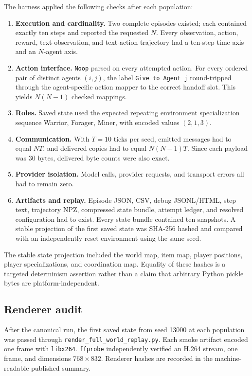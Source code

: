 \documentclass[11pt]{article}
\newcommand{\code}[1]{\texttt{#1}}
\begin{document}
The harness applied the following checks after each population:

\begin{enumerate}
  \item \textbf{Execution and cardinality.}  Two complete episodes existed; each
  contained exactly ten steps and reported the requested $N$.  Every
  observation, action, reward, text-observation, and text-action trajectory had
  a ten-step time axis and an $N$-agent axis.
  \item \textbf{Action interface.}  \code{Noop} parsed on every attempted action.
  For every ordered pair of distinct agents $(i,j)$, the label
  \code{Give to Agent j} round-tripped through the agent-specific action mapper
  to the correct handoff slot.  This yields $N(N-1)$ checked mappings.
  \item \textbf{Roles.}  Saved state used the expected repeating environment
  specialization sequence Warrior, Forager, Miner, with encoded values
  $(2,1,3)$.
  \item \textbf{Communication.}  With $T=10$ ticks per seed, emitted messages
  had to equal $NT$, and delivered copies had to equal $N(N-1)T$.  Since each
  payload was 30 bytes, delivered byte counts were also exact.
  \item \textbf{Provider isolation.}  Model calls, provider requests, and
  transport errors all had to remain zero.
  \item \textbf{Artifacts and replay.}  Episode JSON, CSV, debug JSONL/HTML,
  step text, trajectory NPZ, compressed state bundle, attempt ledger, and
  resolved configuration had to exist.  Every state bundle contained ten
  snapshots.  A stable projection of the first saved state was SHA-256 hashed
  and compared with an independently reset environment using the same seed.
\end{enumerate}

The stable state projection included the world map, item map, player positions,
player specializations, and coordination map.  Equality of these hashes is a
targeted determinism assertion rather than a claim that arbitrary Python pickle
bytes are platform-independent.

\subsection{Renderer audit}

After the canonical run, the first saved state from seed 13000 at each population
was passed through \code{render\_full\_world\_replay.py}.  Each smoke artifact
encoded one frame with \code{libx264}.  \code{ffprobe} independently verified an
H.264 stream, one frame, and dimensions $768\times832$.  Renderer hashes are
recorded in the machine-readable published summary.
\end{document}
